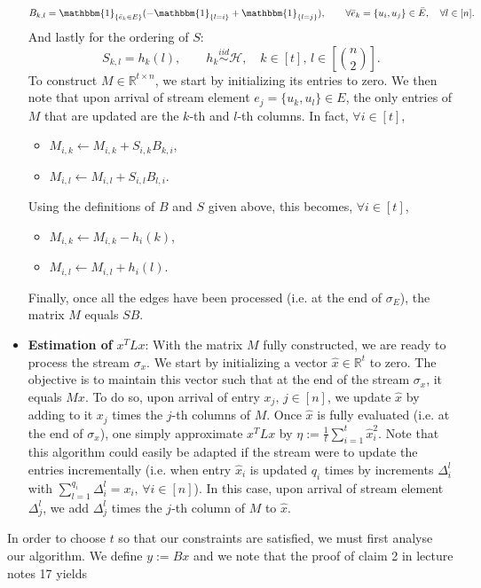 \documentclass[10pt,usenames,dvipsnames]{article}
\newcommand{\R}{\mathbb{R}}
\newcommand{\ind}{\mathbbm{1}} %
\newenvironment{exercise}[2][Exercise]{\begin{trivlist}
  \item[\hskip \labelsep {\bfseries #1}\hskip \labelsep {\bfseries #2.}]}{\end{trivlist}}
\begin{document}
\begin{exercise}{3b}
\begin{itemize}
	$$
	 B_{k, l} = 
	 \ind_{\left\{\bar{e}_k \in E\right\}}( - \ind_{\left\{l=i\right\}} + \ind_{\left\{l=j\right\}}), 
	 \qquad \forall \bar{e}_k = \{u_i,u_j\} \in \bar{E}, \quad \forall l \in [n].
	 $$
	 And lastly for the ordering of $S$:
	 $$
	 S_{k,l} = h_k(l), \qquad h_k \overset{iid}{\sim} \mathcal{H}, \quad k\in [t], \, l \in \left[\binom{n}{2}\right].
	 $$
	To construct $M\in \R^{t\times n}$, we start by initializing its entries to zero. We then note that upon arrival of stream element $e_j=\{u_k,u_l\}\in E$, the only entries of $M$ that are updated are the $k$-th and $l$-th columns. In fact, $\forall i \in [t]$, 
	\begin{itemize}
		\item $M_{i,k} \gets M_{i,k} + S_{i,k}B_{k,i}$,
		\item $M_{i,l} \gets M_{i,l} + S_{i,l}B_{l,i}$.
	\end{itemize}
	Using the definitions of $B$ and $S$ given above, this becomes, $\forall i \in [t]$,
		\begin{itemize}
		\item $M_{i,k} \gets M_{i,k} - h_i(k)$,
		\item $M_{i,l} \gets M_{i,l} + h_i(l)$.
	\end{itemize}
	Finally, once all the edges have been processed (i.e. at the end of $\sigma_E$), the matrix $M$ equals $SB$.
	\item \textbf{Estimation of} $x^T L x$: With the matrix $M$ fully constructed, we are ready to process the stream $\sigma_x$. We start by initializing a vector $\hat{x}\in \R^t$ to zero. The objective is to maintain this vector such that at the end of the stream $\sigma_x$, it equals $Mx$. To do so, upon arrival of entry $x_j, \, j\in [n]$, we update $\hat{x}$ by adding to it $x_j$ times the $j$-th columns of $M$. Once $\hat{x}$ is fully evaluated (i.e. at the end of $\sigma_x$), one simply approximate $x^TLx$ by $\eta := \frac{1}{t}\sum_{i=1}^t \hat{x}_i^2$. Note that this algorithm could easily be adapted if the stream were to update the entries incrementally (i.e. when entry $\hat{x}_i$ is updated $q_i$ times by increments $\Delta_i^l$ with $\sum_{l=1}^{q_i} \Delta_i^l = x_i, \, \forall i \in [n]$). In this case, upon arrival of stream element $\Delta_j^l$, we add $\Delta_j^l$  times the $j$-th column of $M$ to $\hat{x}$.
\end{itemize}
In order to choose $t$ so that our constraints are satisfied, we must first analyse our algorithm. We define $y:=Bx$ and we note that the proof of claim 2 in lecture notes 17 yields 

\end{exercise}
\end{document}
